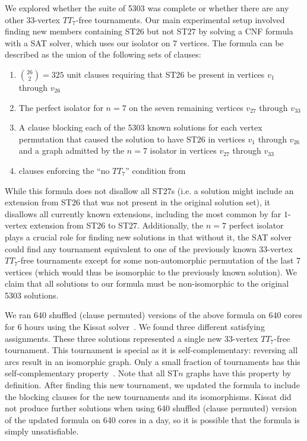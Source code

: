 \documentclass[conference]{IEEEtran}
\begin{document}
We explored whether the suite of 5303 was complete or whether there are any other 33-vertex $TT_7$-free tournaments.
 Our main experimental setup involved finding new members containing ST$26$ but not ST$27$ by solving a CNF formula with a SAT solver, which uses our isolator on 7 vertices. The formula can be described as the union of the following sets of clauses:
 
 \begin{enumerate}
 \item ${26 \choose 2} = 325$ unit clauses requiring that ST26 be present in vertices $v_1$ through $v_{26}$
 \item The perfect isolator for $n=7$ on the seven remaining vertices $v_{27}$ through $v_{33}$
 \item A clause blocking each of the 5303 known solutions for each vertex permutation that caused the solution to have ST$26$ in vertices $v_1$ through $v_{26}$ and a graph admitted by the $n=7$ isolator in vertices $v_{27}$ through $v_{33}$
 \item clauses enforcing the ``no $TT_7$'' condition from \cite{directedramsey}
 \end{enumerate}

While this formula does not disallow all ST$27$s (i.e. a solution might include an extension from ST$26$ that was not present in the original solution set), it disallows all currently known extensions, including the most common by far $1$-vertex extension from ST$26$ to ST$27$. Additionally, the $n=7$ perfect isolator plays a crucial role for finding new solutions in that without it, the SAT solver could find any tournament equivalent to one of the previously known 33-vertex $TT_7$-free tournaments  except for some non-automorphic permutation of the last 7 vertices (which would thus be isomorphic to the previously known solution). We claim that all solutions to our formula must be non-isomorphic to the original 5303 solutions. 

We ran 640 shuffled (clause permuted) versions of the above formula on 640 cores for 6 hours using the Kissat solver~\cite{Kissat}. We found three different satisfying assignments. These three solutions represented  a single new 33-vertex $TT_7$-free tournament. This tournament is special as it is self-complementary: reversing all arcs result in an isomorphic graph. Only a small fraction of tournaments has this self-complementary property~\cite{Eplett}. Note that all ST$n$ graphs have this property by definition. After finding this new tournament, we updated the formula to include the blocking clauses for the new tournaments and its isomorphisms. Kissat did not produce further solutions when using 640 shuffled (clause permuted) version of the updated formula on 640 cores in a day, so it is possible that the formula is simply unsatisfiable. 
\end{document}

